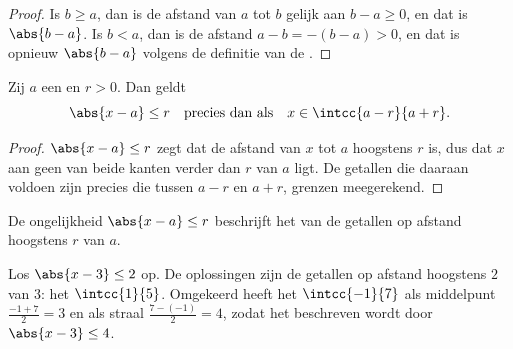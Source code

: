 \begin{proof}
Is $b \geq a$, dan is de afstand van $a$ tot $b$ gelijk aan $b - a \geq 0$,
en dat is $\abs{b-a}$. Is $b < a$, dan is de afstand $a - b = -(b - a) > 0$,
en dat is opnieuw $\abs{b - a}$ volgens de definitie van de .
\end{proof}

\begin{proposition}\label{prop:g10:numbers:absinterval}
Zij $a$ een  en $r > 0$. Dan geldt
\[
\abs{x - a} \leq r
\quad\text{precies dan als}\quad
x \in \intcc{a - r}{a + r}.
\]
\end{proposition}

\begin{proof}
$\abs{x-a} \leq r$ zegt dat de afstand van $x$ tot $a$ hoogstens $r$ is, dus
dat $x$ aan geen van beide kanten verder dan $r$ van $a$ ligt. De getallen
die daaraan voldoen zijn precies die tussen $a - r$ en $a + r$, grenzen
meegerekend.
\end{proof}

\begin{omfigure}

{\small De ongelijkheid $\abs{x - a} \leq r$ beschrijft het  van de
getallen op afstand hoogstens $r$ van $a$.}
\end{omfigure}

\begin{example}\label{ex:g10:numbers:abs}
Los $\abs{x - 3} \leq 2$ op. De oplossingen zijn de getallen op afstand
hoogstens $2$ van $3$: het  $\intcc{1}{5}$. Omgekeerd heeft het
 $\intcc{-1}{7}$ als middelpunt $\frac{-1+7}{2} = 3$ en als straal
$\frac{7-(-1)}{2} = 4$, zodat het beschreven wordt door $\abs{x - 3} \leq 4$.
\end{example}


